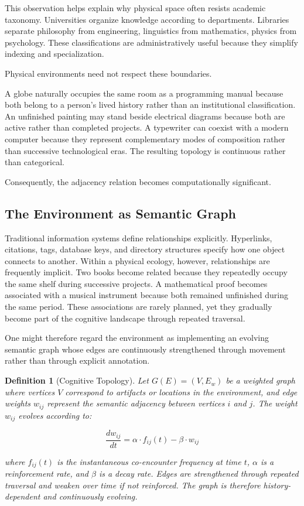 \documentclass[12pt,oneside]{article}
\newtheorem{definition}{Definition}[section]
\theoremstyle{remark}
\begin{document}
This observation helps explain why physical space often resists academic taxonomy. Universities organize knowledge according to departments. Libraries separate philosophy from engineering, linguistics from mathematics, physics from psychology. These classifications are administratively useful because they simplify indexing and specialization.

Physical environments need not respect these boundaries.

A globe naturally occupies the same room as a programming manual because both belong to a person's lived history rather than an institutional classification. An unfinished painting may stand beside electrical diagrams because both are active rather than completed projects. A typewriter can coexist with a modern computer because they represent complementary modes of composition rather than successive technological eras. The resulting topology is continuous rather than categorical.

Consequently, the adjacency relation becomes computationally significant.

\subsection{The Environment as Semantic Graph}

Traditional information systems define relationships explicitly. Hyperlinks, citations, tags, database keys, and directory structures specify how one object connects to another. Within a physical ecology, however, relationships are frequently implicit. Two books become related because they repeatedly occupy the same shelf during successive projects. A mathematical proof becomes associated with a musical instrument because both remained unfinished during the same period. These associations are rarely planned, yet they gradually become part of the cognitive landscape through repeated traversal.

One might therefore regard the environment as implementing an evolving semantic graph whose edges are continuously strengthened through movement rather than through explicit annotation.

\begin{definition}[Cognitive Topology]
Let $G(E) = (V, E_w)$ be a weighted graph where vertices $V$ correspond to artifacts or locations in the environment, and edge weights $w_{ij}$ represent the semantic adjacency between vertices $i$ and $j$. The weight $w_{ij}$ evolves according to:

\begin{equation}
\frac{dw_{ij}}{dt} = \alpha \cdot f_{ij}(t) - \beta \cdot w_{ij}
\end{equation}

where $f_{ij}(t)$ is the instantaneous co-encounter frequency at time $t$, $\alpha$ is a reinforcement rate, and $\beta$ is a decay rate. Edges are strengthened through repeated traversal and weaken over time if not reinforced. The graph is therefore history-dependent and continuously evolving.
\end{definition}
\end{document}
